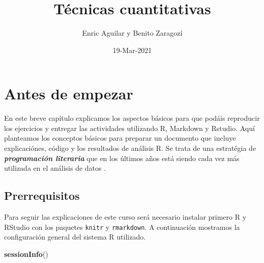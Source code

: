\documentclass[
]{book}
\title{Técnicas cuantitativas}
\author{Enric Aguilar y Benito Zaragozí}
\date{19-Mar-2021}
\newenvironment{Shaded}{\begin{snugshade}}{\end{snugshade}}
\newcommand{\KeywordTok}[1]{\textcolor[rgb]{0.13,0.29,0.53}{\textbf{#1}}}
\newcommand{\NormalTok}[1]{#1}
\begin{document}
\maketitle

{
\setcounter{tocdepth}{1}
\tableofcontents
}
\hypertarget{antes-de-empezar}{%
\chapter{Antes de empezar}\label{antes-de-empezar}}

En este breve capítulo explicamos los aspectos básicos para que podáis reproducir los ejercicios y entregar las actividades utilizando R, Markdown y Rstudio. Aquí planteamos los conceptos básicos para preparar un documento que incluye explicaciónes, código y los resultados de análisis R. Se trata de una estratégia de \textbf{\emph{programación literaria}} que en los últimos años está siendo cada vez más utilizada en el análisis de datos \citep{knuth1984literate, xie2015knitr}.

\hypertarget{prerrequisitos}{%
\section{Prerrequisitos}\label{prerrequisitos}}

Para seguir las explicaciones de este curso será necesario instalar primero R y RStudio con los paquetes \texttt{knitr} y \texttt{rmarkdown}. A continuación mostramos la configuración general del sistema R utilizado.

\begin{Shaded}
\begin{Highlighting}[]
\KeywordTok{sessionInfo}\NormalTok{()}
\end{Highlighting}
\end{Shaded}
\end{document}
